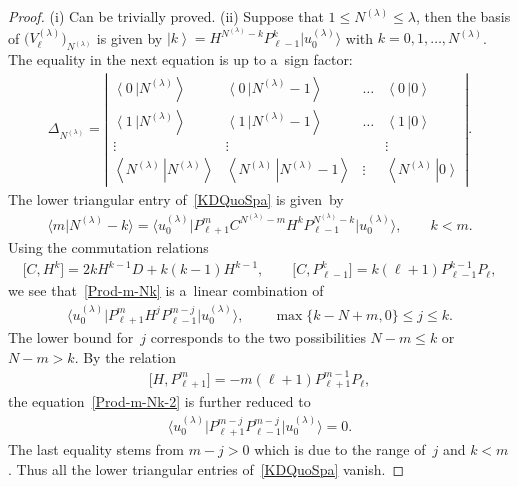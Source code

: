 \documentclass[11pt]{article}
\numberwithin{equation}{section}
\def\ket#1{\left| #1\right\rangle}
\def\bracket#1#2{\left\langle #1  \,\right| \left. #2 \right\rangle}
\begin{document}
\begin{proof}
(i) Can be trivially proved.
 (ii) Suppose that $ 1 \leq N^{(\lambda)} \leq \lambda$, then the basis of $
\big(V_{\ell}^{(\lambda)}\big)_{N^{(\lambda)}} $ is given by $ \ket{k} = H^{N^{(\lambda)}-k} P_{\ell-1}^k \big|u_0^{(\lambda)}\big\rangle
$ with $ k = 0, 1, \dots, N^{(\lambda)}$.
The equality in the next equation is up to a~sign factor:
\begin{gather}
\Delta_{N^{(\lambda)}} = \left|
\begin{matrix} \bracket{0}{N^{(\lambda)}} & \bracket{0}{N^{(\lambda)}-1} & \dots & \bracket{0}{0}
\\ \bracket{1}{N^{(\lambda)}} & \bracket{1}{N^{(\lambda)}-1} & \dots & \bracket{1}{0}
\\
\vdots & \vdots & & \vdots
\\
\bracket{N^{(\lambda)}}{N^{(\lambda)}} & \bracket{N^{(\lambda)}}{N^{(\lambda)}-1} & \vdots & \bracket{N^{(\lambda)}}{0}
\end{matrix}
\right|.
\label{KDQuoSpa}
\end{gather}
The lower triangular entry of~\eqref{KDQuoSpa} is given~by
\begin{gather}
\big\langle m \big|  N^{(\lambda)}-k\big\rangle  = \big\langle u_0^{(\lambda)}\big| P_{\ell+1}^m C^{N^{(\lambda)}-m} H^k P_{\ell-1}^{N^{(\lambda)}-k}
\big|u_0^{(\lambda)}\big\rangle ,
\qquad
k < m.
\label{Prod-m-Nk}
\end{gather}
Using the commutation relations
\begin{gather*}
\big[C, H^k\big] = 2k H^{k-1} D + k(k-1) H^{k-1},
\qquad
\big[C, P_{\ell-1}^k\big] = k (\ell+1) P_{\ell-1}^{k-1} P_{\ell},
\end{gather*}
we see that~\eqref{Prod-m-Nk} is a~linear combination of
\begin{gather}
\big\langle u_0^{(\lambda)}\big| P_{\ell+1}^m H^j P_{\ell-1}^{m-j} \big|u_0^{(\lambda)}\big\rangle ,
\qquad
\max\{k-N+m, 0\} \leq j \leq k.
\label{Prod-m-Nk-2}
\end{gather}
The lower bound for~$j$ corresponds to the two possibilities $ N-m \leq k $ or $ N-m > k$.
By the relation
\begin{gather*}
\big[H, P_{\ell+1}^m\big] = -m(\ell+1) P_{\ell+1}^{m-1} P_{\ell},
\end{gather*}
the equation~\eqref{Prod-m-Nk-2} is further reduced to
\begin{gather*}
\big\langle u_0^{(\lambda)}\big| P_{\ell+1}^{m-j} P_{\ell-1}^{m-j} \big|u_0^{(\lambda)}\big\rangle  = 0.
\end{gather*}
The last equality stems from $ m -j > 0 $ which is due to the range of~$j$ and $ k < m$.
Thus all the lower triangular entries of~\eqref{KDQuoSpa} vanish.


\end{proof}
\end{document}
